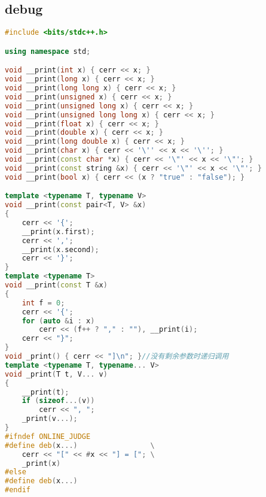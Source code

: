 \subsection{debug}
\begin{lstlisting}[language=C++]
#include <bits/stdc++.h>

using namespace std;

void __print(int x) { cerr << x; }
void __print(long x) { cerr << x; }
void __print(long long x) { cerr << x; }
void __print(unsigned x) { cerr << x; }
void __print(unsigned long x) { cerr << x; }
void __print(unsigned long long x) { cerr << x; }
void __print(float x) { cerr << x; }
void __print(double x) { cerr << x; }
void __print(long double x) { cerr << x; }
void __print(char x) { cerr << '\'' << x << '\''; }
void __print(const char *x) { cerr << '\"' << x << '\"'; }
void __print(const string &x) { cerr << '\"' << x << '\"'; }
void __print(bool x) { cerr << (x ? "true" : "false"); }

template <typename T, typename V>
void __print(const pair<T, V> &x)
{
    cerr << '{';
    __print(x.first);
    cerr << ',';
    __print(x.second);
    cerr << '}';
}
template <typename T>
void __print(const T &x)
{
    int f = 0;
    cerr << '{';
    for (auto &i : x)
        cerr << (f++ ? "," : ""), __print(i);
    cerr << "}";
}
void _print() { cerr << "]\n"; }//没有剩余参数时递归调用
template <typename T, typename... V>
void _print(T t, V... v)
{
    __print(t);
    if (sizeof...(v))
        cerr << ", ";
    _print(v...);
}
#ifndef ONLINE_JUDGE
#define deb(x...)                 \
    cerr << "[" << #x << "] = ["; \
    _print(x)
#else
#define deb(x...)
#endif
\end{lstlisting}
